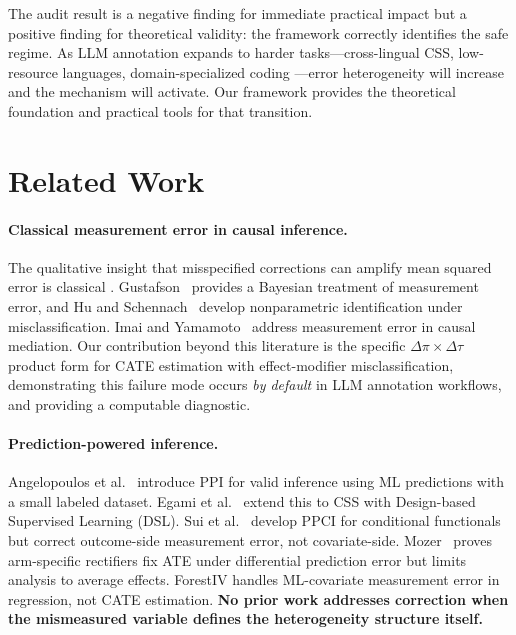 \documentclass[11pt,a4paper]{article}
\begin{document}
The audit result is a negative finding for immediate practical impact but a positive finding for theoretical validity: the framework correctly identifies the safe regime.
As LLM annotation expands to harder tasks---cross-lingual CSS, low-resource languages, domain-specialized coding \cite{ashwin2025using}---error heterogeneity will increase and the mechanism will activate.
Our framework provides the theoretical foundation and practical tools for that transition.


\section{Related Work}
\label{sec:related}

\paragraph{Classical measurement error in causal inference.}
The qualitative insight that misspecified corrections can amplify mean squared error is classical \cite{fuller1987measurement,carroll2006measurement}.
Gustafson~ provides a Bayesian treatment of measurement error, and Hu and Schennach~ develop nonparametric identification under misclassification.
Imai and Yamamoto~ address measurement error in causal mediation.
Our contribution beyond this literature is the specific $\Delta\pi \times \Delta\tau$ product form for CATE estimation with effect-modifier misclassification, demonstrating this failure mode occurs \emph{by default} in LLM annotation workflows, and providing a computable diagnostic.

\paragraph{Prediction-powered inference.}
Angelopoulos et al.~ introduce PPI for valid inference using ML predictions with a small labeled dataset.
Egami et al.~ extend this to CSS with Design-based Supervised Learning (DSL).
Sui et al.~ develop PPCI for conditional functionals but correct outcome-side measurement error, not covariate-side.
Mozer~ proves arm-specific rectifiers fix ATE under differential prediction error but limits analysis to average effects.
ForestIV \cite{bu2023forestly} handles ML-covariate measurement error in regression, not CATE estimation.
\textbf{No prior work addresses correction when the mismeasured variable defines the heterogeneity structure itself.}
\end{document}
